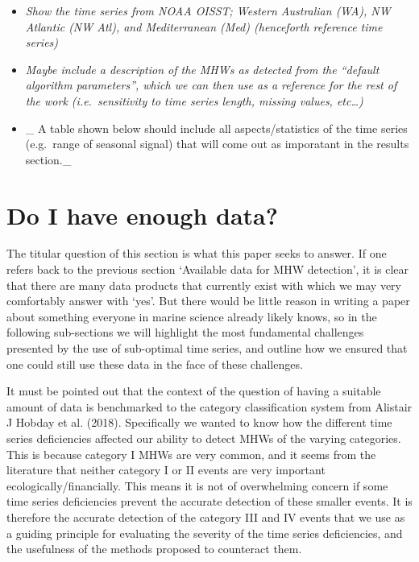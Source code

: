 \documentclass[]{article}
\providecommand{\tightlist}{%
  \setlength{\itemsep}{0pt}\setlength{\parskip}{0pt}}
\begin{document}
\begin{itemize}
\tightlist
\item
  \emph{Show the time series from NOAA OISST; Western Australian (WA),
  NW Atlantic (NW Atl), and Mediterranean (Med) (henceforth reference
  time series)}
\item
  \emph{Maybe include a description of the MHWs as detected from the
  ``default algorithm parameters'', which we can then use as a reference
  for the rest of the work (i.e.~sensitivity to time series length,
  missing values, etc\ldots{})}
\item
  \_ A table shown below should include all aspects/statistics of the
  time series (e.g.~range of seasonal signal) that will come out as
  imporatant in the results section.\_
\end{itemize}

\section{Do I have enough data?}\label{do-i-have-enough-data}

The titular question of this section is what this paper seeks to answer.
If one refers back to the previous section `Available data for MHW
detection', it is clear that there are many data products that currently
exist with which we may very comfortably answer with `yes'. But there
would be little reason in writing a paper about something everyone in
marine science already likely knows, so in the following sub-sections we
will highlight the most fundamental challenges presented by the use of
sub-optimal time series, and outline how we ensured that one could still
use these data in the face of these challenges.

It must be pointed out that the context of the question of having a
suitable amount of data is benchmarked to the category classification
system from Alistair J Hobday et al. (2018). Specifically we wanted to
know how the different time series deficiencies affected our ability to
detect MHWs of the varying categories. This is because category I MHWs
are very common, and it seems from the literature that neither category
I or II events are very important ecologically/financially. This means
it is not of overwhelming concern if some time series deficiencies
prevent the accurate detection of these smaller events. It is therefore
the accurate detection of the category III and IV events that we use as
a guiding principle for evaluating the severity of the time series
deficiencies, and the usefulness of the methods proposed to counteract
them.
\end{document}

